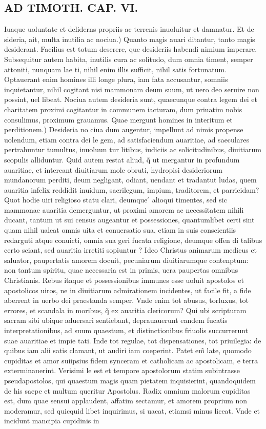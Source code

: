 \documentclass{article}
\begin{document}
\begin{pages}
\section*{AD TIMOTH. CAP. VI. }
\marginpar{[ p.535 ]}\pstart Iuaque uoluntate et deliderns propriis ac terrenis inuoluitur et damnatur. Et de sideria, ait, multa inutilia ac nociua.) Quanto magis auari ditantur, tanto magis desiderant. Facilius est totum deserere, que desideriis habendi nimium imperare. Subsequitur autem habita, inutilis cura ac solitudo, dum omnia timent, semper attoniti, nunquam lae ti, nihil enim illis sufficit, nihil satis fortunatum. Optauerant enim homines illi longe plura, iam fata accusantur, somniis inquietantur, nihil cogitant nisi mammonam deum suum, ut uero deo seruire non possint, uel libeat. Nociua autem desideria sunt, quaecunque contra legem dei et charitatem proximi cogitantur in communem iacturam, dum priuatim nobis consulimus, proximum grauamus. Quae mergunt homines in interitum et perditionem.) Desideria no ciua dum augentur, impellunt ad nimis propense uolendum, etiam contra dei le gem, ad satisfaciendum auaritiae, ad saeculares pertrahuntur tumultus, inuoluun tur litibus, iudiciis ac solicitudinibus, diuitiarum scopulis alliduntur. Quid autem restat aliud, q̃ ut mergantur in profundum auaritiae, et intereant diuitiarum mole obruti, hydropisi desideriorum mundanorum perditi, deum negligant, odiant, uendant et tradantut ludas, quem auaritia infelix reddidit inuidum, sacrilegum, impium, traditorem, et parricidam? Quot hodie uiri religioso statu clari, deumque ́ alioqui timentes, sed sic mammonae auaritia demerguntur, ut proximi amorem ac necessitatem nihili ducant, tantum ut sui census augeantur et possessiones, quantumlibet certi sint quam nihil ualeat omnis uita et conuersatio sua, etiam in suis conscientiis redarguti atque conuicti, omnia sua geri fucata religione, deumque offen di talibus certo sciant, sed auaritia irretiti sopiuntur ? Ideo Christus animarum medicus et saluator, paupertatis amorem docuit, pecuniarum diuitiarumque contenptum: non tantum spiritu, quae necessaria est in primis, uera paupertas omnibus Christianis. Rebus itaque et possessionibus immunes esse uoluit apostolos et apostolicos uiros, ne in diuitiarum admirationem incidentes, ut facile fit, a fide aberrent in uerbo dei praestanda semper. Vnde enim tot abusus, torluxus, tot errores, et scandala in moribus, q̃ ex auaritia clericorum? Qui ubi scripturam sacram sibi ubique aduersari sentiebant, deprauauerunt eandem fucatis interpretationibus, ad suum quaestum, et distinctionibus friuolis succurrerunt suae auaritiae et impie tati. Inde tot regulae, tot dispensationes, tot priuilegia: de quibus iam alii satis clamant, ut audiri iam coeperint. Patet em̃ late, quomodo cupiditas et amor suiipsius fidem synceram et catholicam ac apostolicam, e terra exterminauerint. Verisimi le est et tempore apostolorum statim subintrasse pseudapostolos, qui quaestum magis quam pietatem inquisierint, quandoquidem de his saepe et multum queritur Apostolus. Radix omnium malorum cupiditas est, dum quae sensui applaudent, affatim sectamur, et amorem proprium non moderamur, sed quicquid libet inquirimus, si uacat, etiamsi minus liceat. Vnde et incidunt mancipia cupidinis in 
\end{pages}
\end{document}
